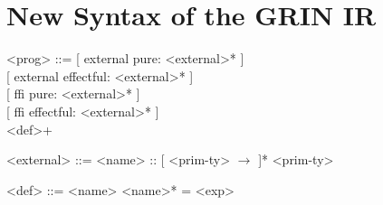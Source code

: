 \documentclass[main.tex]{subfiles}
\begin{document}
	
	\section{New Syntax of the GRIN IR}
	
	\setlength{\grammarparsep}{0.1cm} %
	\setlength{\grammarindent}{2.5cm} %
	\begin{grammar}
		<prog> ::= {[} external pure: <external>* {]} \\ 
		{[} external effectful: <external>* {]} \\
		{[} ffi pure: <external>* {]} \\
		{[} ffi effectful: <external>* {]} \\
		<def>+
		
		<external> ::= <name> :: {[} <prim-ty> $\rightarrow$ {]}* <prim-ty>
		
		<def> ::= <name> <name>* = <exp>
	\end{grammar}
\end{document}
